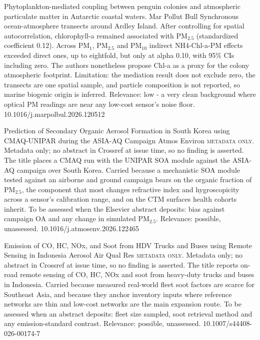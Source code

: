 \documentclass[10pt]{article}
\begin{document}
{Phytoplankton-mediated coupling between penguin colonies and atmospheric particulate matter in Antarctic coastal waters.}
{Mar Pollut Bull}
{Synchronous ocean-atmosphere transects around Ardley Island. After controlling for spatial autocorrelation, chlorophyll-a remained associated with PM$_{2.5}$ (standardized coefficient 0.12). Across PM$_{1}$, PM$_{2.5}$ and PM$_{10}$ indirect NH4-Chl-a-PM effects exceeded direct ones, up to eightfold, but only at alpha 0.10, with 95\% CIs including zero. The authors nonetheless propose Chl-a as a proxy for the colony atmospheric footprint. Limitation: the mediation result does not exclude zero, the transects are one spatial sample, and particle composition is not reported, so marine biogenic origin is inferred. Relevance: low - a very clean background where optical PM readings are near any low-cost sensor's noise floor.}
{10.1016/j.marpolbul.2026.120512}

{Prediction of Secondary Organic Aerosol Formation in South Korea using CMAQ-UNIPAR during the ASIA-AQ Campaign}
{Atmos Environ}
{\textsc{metadata only.} Metadata only; no abstract in Crossref at issue time, so no finding is asserted. The title places a CMAQ run with the UNIPAR SOA module against the ASIA-AQ campaign over South Korea. Carried because a mechanistic SOA module tested against an airborne and ground campaign bears on the organic fraction of PM$_{2.5}$, the component that most changes refractive index and hygroscopicity across a sensor's calibration range, and on the CTM surfaces health cohorts inherit. To be assessed when the Elsevier abstract deposits: bias against campaign OA and any change in simulated PM$_{2.5}$. Relevance: possible, unassessed.}
{10.1016/j.atmosenv.2026.122465}

{Emission of CO, HC, NOx, and Soot from HDV Trucks and Buses using Remote Sensing in Indonesia}
{Aerosol Air Qual Res}
{\textsc{metadata only.} Metadata only; no abstract in Crossref at issue time, so no finding is asserted. The title reports on-road remote sensing of CO, HC, NOx and soot from heavy-duty trucks and buses in Indonesia. Carried because measured real-world fleet soot factors are scarce for Southeast Asia, and because they anchor inventory inputs where reference networks are thin and low-cost networks are the main expansion route. To be assessed when an abstract deposits: fleet size sampled, soot retrieval method and any emission-standard contrast. Relevance: possible, unassessed.}
{10.1007/s44408-026-00174-7}
\end{document}
